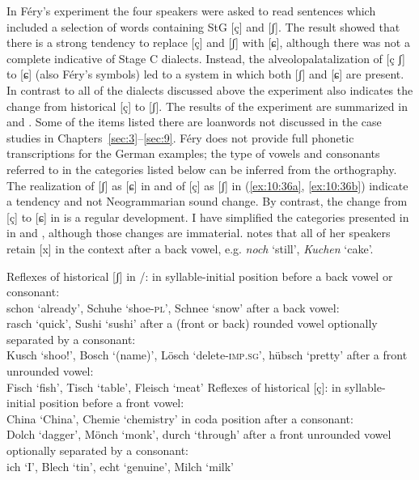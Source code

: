 \begin{xlist}
In Féry’s experiment the four speakers were asked to read sentences which included a selection of words containing StG [ç] and [ʃ]. The result showed that there is a strong tendency to replace [ç] and [ʃ] with [ɕ], although there was not a complete  indicative of Stage C dialects. Instead, the alveolopalatalization of [ç ʃ] to [ɕ] (also Féry’s symbols) led to a system in which both [ʃ] and [ɕ] are present. In contrast to all of the dialects discussed above the experiment also indicates the change from historical [ç] to [ʃ]. The results of the experiment are summarized in  and . Some of the items listed there are loanwords not discussed in the case studies in Chapters~\ref{sec:3}--\ref{sec:9}. Féry does not provide full phonetic transcriptions for the German examples; the type of vowels and consonants referred to in the categories listed below can be inferred from the orthography. The realization of [ʃ] as [ɕ] in  and of [ç] as [ʃ] in (\ref{ex:10:36a}, \ref{ex:10:36b}) indicate a tendency and not Neogrammarian sound change. By contrast, the change from [ç] to [ɕ] in  is a regular development. I have simplified the categories presented in \citet{Féry2017} in  and , although those changes are immaterial. \citet{Féry2017} notes that all of her speakers retain [x] in the context after a back vowel, e.g. \textit{noch} ‘still’, \textit{Kuchen} ‘cake’.\largerpage[-1]

\ea%
\label{ex:10:35}Reflexes of historical [ʃ] in /:
\ea\label{ex:10:35a}\relax [ʃ] in syllable-initial position before a back vowel or consonant:\\
    schon ‘already’, Schuhe ‘shoe-\textsc{pl}’, Schnee ‘snow’
\ex\label{ex:10:35b}\relax [ʃ] after a back vowel:\\
rasch ‘quick’, Sushi ‘sushi’
\ex\label{ex:10:35c}\relax [ʃ] after a (front or back) rounded vowel optionally separated by a consonant:\\
Kusch ‘shoo!’, Bosch ‘(name)’, Lösch ‘delete\textsc{{}-imp.sg}’, hübsch ‘pretty’
\ex\label{ex:10:35d}\relax [ɕ] after a front unrounded vowel:\\
Fisch ‘fish’, Tisch ‘table’, Fleisch ‘meat’
    \z
\ex%
\label{ex:10:36}Reflexes of historical [ç]:
\ea\label{ex:10:36a}\relax [ʃ] in syllable-initial position before a front vowel:\\
China ‘China’, Chemie ‘chemistry’
\ex\label{ex:10:36b}\relax [ʃ] in coda position after a consonant:\\
Dolch ‘dagger’, Mönch ‘monk’, durch ‘through’
\ex\label{ex:10:36c}\relax [ɕ] after a front unrounded vowel optionally separated by a consonant:\\
ich ‘I’, Blech ‘tin’, echt ‘genuine’, Milch ‘milk’
    \z
\z 


\end{xlist}
